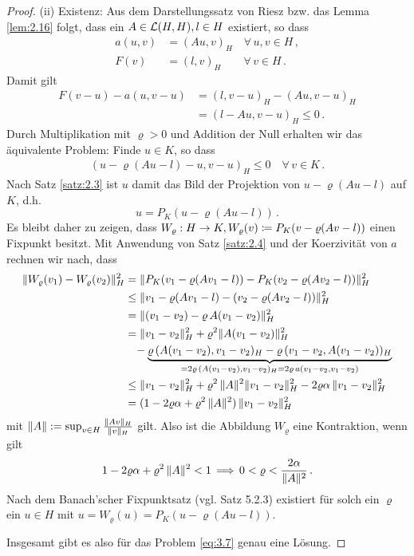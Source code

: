 \begin{proof}
(ii) Existenz: Aus dem Darstellungssatz von Riesz bzw. das Lemma \ref{lem:2.16} folgt, dass ein $A \in \mathcal L(H,H), l \in H$ existiert, so dass
\begin{align*}
	a(u,v) &= (Au,v)_H \quad \forall \, u,v \in H\, , \\
	F(v) &= (l,v)_H \qquad \forall \, v \in H \, .
\end{align*}
Damit gilt
\begin{align*}
	  F(v-u) - a(u,v-u) &= (l,v-u)_H - (Au,v-u)_H \\
	 &=   (l-Au,v-u)_H \le 0 \, .
\end{align*}
Durch Multiplikation mit $\varrho > 0$ und Addition der Null erhalten wir das äquivalente Problem: Finde $u \in K$, so dass
\begin{align}
	(u-\varrho(Au-l)-u,v-u)_H \le 0 \quad \forall \, v \in K \, .
\end{align}
Nach Satz \ref{satz:2.3} ist $u$ damit das Bild der Projektion von $u-\varrho (Au-l)$ auf $K$, d.h.
\[
	u = P_K (u-\varrho (Au-l)) \,.
\]
Es bleibt daher zu zeigen, dass $W_\varrho : H \rightarrow K, W_\varrho (v) \coloneqq P_K(v-\varrho (Av-l))$ einen Fixpunkt besitzt. Mit Anwendung von Satz \ref{satz:2.4} und der Koerzivität von $a$ rechnen wir nach, dass
\begin{align*}
	\lVert W_\varrho (v_1) - W_\varrho (v_2)\rVert_H^2  & = \lVert  P_K (v_1-\varrho (Av_1-l))- P_K (v_2-\varrho (Av_2-l))  \rVert_H^2 \\
	& \le \lVert v_1-\varrho (Av_1-l)- (v_2-\varrho (Av_2-l))  \rVert_H^2  \\
	& = \lVert (v_1-v_2)-\varrho \, A(v_1-v_2)  \rVert_H^2  \\
	& = \lVert v_1-v_2\rVert_H^2 + \varrho^2 \lVert A(v_1-v_2)\rVert^2_H \\
	& \ \ \, - \underbrace{ \varrho\, (A(v_1-v_2),v_1-v_2)_H - \varrho\, (v_1-v_2,A(v_1-v_2))_H}_{=2\varrho\, (A(v_1-v_2),v_1-v_2)_H  =2\varrho\, a(v_1-v_2,v_1-v_2)} \\
	& \le \lVert v_1-v_2\rVert_H^2 + \varrho^2\, \lVert A\rVert^2 \lVert v_1-v_2\rVert_H^2 - 2\varrho\alpha \, \lVert v_1-v_2\rVert_H^2 \\
	& = (1-2\varrho \alpha+\varrho^2 \, \lVert A\rVert^2) \,\lVert v_1-v_2\rVert_H^2
\end{align*}
mit $\lVert A\rVert := \sup_{v \in H} \frac{\lVert Av\rVert_H}{\lVert v\rVert_H}$ gilt. Also ist die Abbildung $W_\varrho$  eine Kontraktion, wenn gilt
\begin{align*}
	1-2\varrho \alpha+\varrho^2 \, \lVert A\rVert^2 < 1 \, \Longrightarrow\, 0 < \varrho < \frac {2\alpha}{\lVert A\rVert^2} \, .
\end{align*}
Nach dem Banach'scher Fixpunktsatz (vgl. \cite{Stoer} Satz 5.2.3) existiert für solch ein $\varrho$ ein $u \in H$ mit $u = W_\varrho (u) = P_K(u-\varrho (Au-l))$.

Insgesamt gibt es also für das Problem \eqref{eq:3.7} genau eine  Lösung.
\end{proof}

